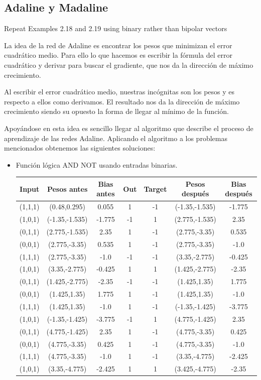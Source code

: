 \subsection{Adaline y Madaline}
\begin{problem}[16]
Repeat Examples 2.18 and 2.19 using binary rather than bipolar vectors
\solution

La idea de la red de Adaline es encontrar los pesos que minimizan el error cuadrático medio. Para ello lo que hacemos es escribir la fórmula del error cuadrático y derivar para buscar el gradiente, que nos da la dirección de máximo crecimiento.

Al escribir el error cuadrático medio, nuestras incógnitas son los pesos y es respecto a ellos como derivamos. El resultado nos da la dirección de máximo crecimiento siendo su opuesto la forma de llegar al mínimo de la función.

Apoyándose en esta idea es sencillo llegar al algoritmo que describe el proceso de aprendizaje de las redes Adaline. Aplicando el algoritmo a los problemas mencionados obtenemos las siguientes soluciones:

\begin{itemize}
\item Función lógica AND NOT usando entradas binarias.


\begin{center}
\begin{tabular}{|c|c|c|c|c|c|c|}
\hline
\textbf{Input} & \textbf{Pesos antes} &  \textbf{Bias antes} & \textbf{Out} & \textbf{Target} & \textbf{Pesos después} & \textbf{Bias después} \\
\hline
(1,1,1) & (0.48,0.295) & 0.055 & 1 & -1 & (-1.35,-1.535) & -1.775\\
(1,0,1) & (-1.35,-1.535) & -1.775 & -1 & 1 & (2.775,-1.535) & 2.35\\
(0,1,1) & (2.775,-1.535) & 2.35 & 1 & -1 & (2.775,-3.35) & 0.535\\
(0,0,1) & (2.775,-3.35) & 0.535 & 1 & -1 & (2.775,-3.35) & -1.0\\
(1,1,1) & (2.775,-3.35) & -1.0 & -1 & -1 & (3.35,-2.775) & -0.425\\
(1,0,1) & (3.35,-2.775) & -0.425 & 1 & 1 & (1.425,-2.775) & -2.35\\
(0,1,1) & (1.425,-2.775) & -2.35 & -1 & -1 & (1.425,1.35) & 1.775\\
(0,0,1) & (1.425,1.35) & 1.775 & 1 & -1 & (1.425,1.35) & -1.0\\
(1,1,1) & (1.425,1.35) & -1.0 & 1 & -1 & (-1.35,-1.425) & -3.775\\
(1,0,1) & (-1.35,-1.425) & -3.775 & -1 & 1 & (4.775,-1.425) & 2.35\\
(0,1,1) & (4.775,-1.425) & 2.35 & 1 & -1 & (4.775,-3.35) & 0.425\\
(0,0,1) & (4.775,-3.35) & 0.425 & 1 & -1 & (4.775,-3.35) & -1.0\\
(1,1,1) & (4.775,-3.35) & -1.0 & 1 & -1 & (3.35,-4.775) & -2.425\\
(1,0,1) & (3.35,-4.775) & -2.425 & 1 & 1 & (3.425,-4.775) & -2.35\\
\hline
\end{tabular}
\end{center}


\end{itemize}
\end{problem}
